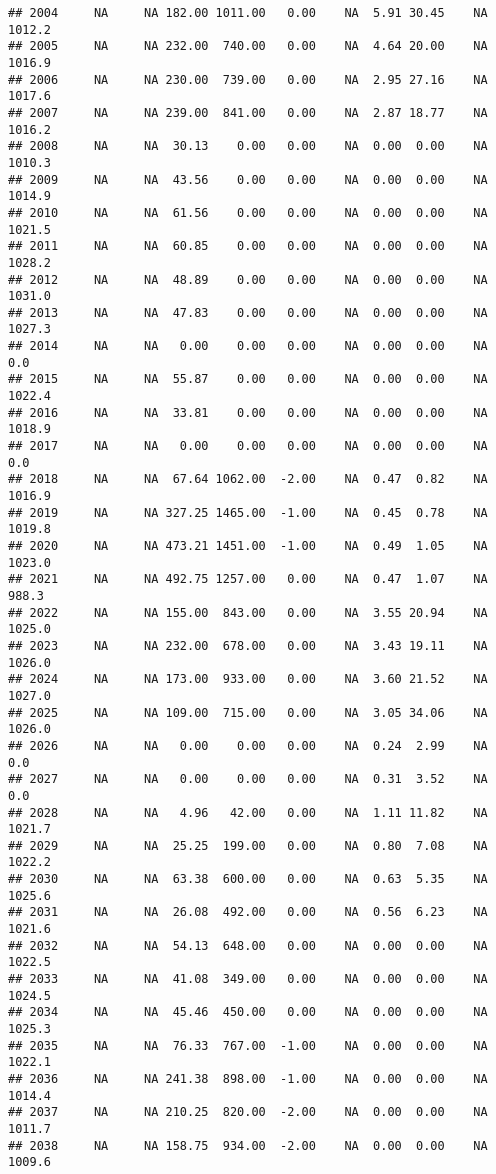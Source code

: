 \documentclass{article}\usepackage{graphicx, color}
\makeatletter
\newenvironment{kframe}{%
 \def\at@end@of@kframe{}%
 \ifinner\ifhmode%
  \def\at@end@of@kframe{\end{minipage}}%
  \begin{minipage}{\columnwidth}%
 \fi\fi%
 \def\FrameCommand##1{\hskip\@totalleftmargin \hskip-\fboxsep
 \colorbox{shadecolor}{##1}\hskip-\fboxsep
     \hskip-\linewidth \hskip-\@totalleftmargin \hskip\columnwidth}%
 \MakeFramed {\advance\hsize-\width
   \@totalleftmargin\z@ \linewidth\hsize
   \@setminipage}}%
 {\par\unskip\endMakeFramed%
 \at@end@of@kframe}
\newenvironment{knitrout}{}{} %
\makeatother
\begin{document}
\begin{knitrout}
\begin{kframe}
\begin{verbatim}
## 2004     NA     NA 182.00 1011.00   0.00    NA  5.91 30.45    NA 1012.2
## 2005     NA     NA 232.00  740.00   0.00    NA  4.64 20.00    NA 1016.9
## 2006     NA     NA 230.00  739.00   0.00    NA  2.95 27.16    NA 1017.6
## 2007     NA     NA 239.00  841.00   0.00    NA  2.87 18.77    NA 1016.2
## 2008     NA     NA  30.13    0.00   0.00    NA  0.00  0.00    NA 1010.3
## 2009     NA     NA  43.56    0.00   0.00    NA  0.00  0.00    NA 1014.9
## 2010     NA     NA  61.56    0.00   0.00    NA  0.00  0.00    NA 1021.5
## 2011     NA     NA  60.85    0.00   0.00    NA  0.00  0.00    NA 1028.2
## 2012     NA     NA  48.89    0.00   0.00    NA  0.00  0.00    NA 1031.0
## 2013     NA     NA  47.83    0.00   0.00    NA  0.00  0.00    NA 1027.3
## 2014     NA     NA   0.00    0.00   0.00    NA  0.00  0.00    NA    0.0
## 2015     NA     NA  55.87    0.00   0.00    NA  0.00  0.00    NA 1022.4
## 2016     NA     NA  33.81    0.00   0.00    NA  0.00  0.00    NA 1018.9
## 2017     NA     NA   0.00    0.00   0.00    NA  0.00  0.00    NA    0.0
## 2018     NA     NA  67.64 1062.00  -2.00    NA  0.47  0.82    NA 1016.9
## 2019     NA     NA 327.25 1465.00  -1.00    NA  0.45  0.78    NA 1019.8
## 2020     NA     NA 473.21 1451.00  -1.00    NA  0.49  1.05    NA 1023.0
## 2021     NA     NA 492.75 1257.00   0.00    NA  0.47  1.07    NA  988.3
## 2022     NA     NA 155.00  843.00   0.00    NA  3.55 20.94    NA 1025.0
## 2023     NA     NA 232.00  678.00   0.00    NA  3.43 19.11    NA 1026.0
## 2024     NA     NA 173.00  933.00   0.00    NA  3.60 21.52    NA 1027.0
## 2025     NA     NA 109.00  715.00   0.00    NA  3.05 34.06    NA 1026.0
## 2026     NA     NA   0.00    0.00   0.00    NA  0.24  2.99    NA    0.0
## 2027     NA     NA   0.00    0.00   0.00    NA  0.31  3.52    NA    0.0
## 2028     NA     NA   4.96   42.00   0.00    NA  1.11 11.82    NA 1021.7
## 2029     NA     NA  25.25  199.00   0.00    NA  0.80  7.08    NA 1022.2
## 2030     NA     NA  63.38  600.00   0.00    NA  0.63  5.35    NA 1025.6
## 2031     NA     NA  26.08  492.00   0.00    NA  0.56  6.23    NA 1021.6
## 2032     NA     NA  54.13  648.00   0.00    NA  0.00  0.00    NA 1022.5
## 2033     NA     NA  41.08  349.00   0.00    NA  0.00  0.00    NA 1024.5
## 2034     NA     NA  45.46  450.00   0.00    NA  0.00  0.00    NA 1025.3
## 2035     NA     NA  76.33  767.00  -1.00    NA  0.00  0.00    NA 1022.1
## 2036     NA     NA 241.38  898.00  -1.00    NA  0.00  0.00    NA 1014.4
## 2037     NA     NA 210.25  820.00  -2.00    NA  0.00  0.00    NA 1011.7
## 2038     NA     NA 158.75  934.00  -2.00    NA  0.00  0.00    NA 1009.6

\end{verbatim}
\end{kframe}
\end{knitrout}
\end{document}
